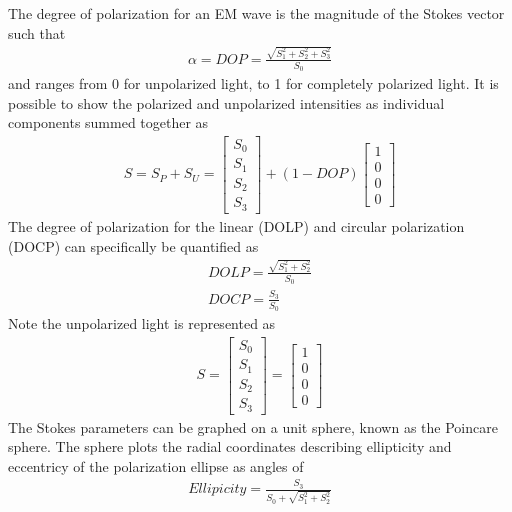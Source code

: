 %
The degree of polarization for an EM wave is the magnitude of the Stokes vector such that
%
\begin{align}
    \alpha =DOP=  \frac{\sqrt{S_1^2+S_2^2+S_3^2 }}{S_0}
\end{align}
%
and ranges from 0 for unpolarized light, to 1 for completely polarized light.  It is possible to show the polarized and unpolarized intensities as individual components
summed together as
%
\begin{align}
    S=S_P+S_U=
    \begin{bmatrix}
        S_0 \\
        S_1 \\
        S_2 \\
        S_3
    \end{bmatrix}
    +(1-DOP)
    \begin{bmatrix}
        1 \\
        0 \\
        0 \\
        0
    \end{bmatrix}
\end{align}
%
The degree of polarization for the linear (DOLP) and circular polarization (DOCP) can specifically be quantified as
%
\begin{align}
    DOLP=  \frac{\sqrt{S_1^2+S_2^2 }}{S_0} \\
    DOCP=  \frac{S_3}{S_0}
\end{align}
%
Note the unpolarized light is represented as
%
\begin{align}
    S=
    \begin{bmatrix}
        S_0 \\
        S_1 \\
        S_2 \\
        S_3
    \end{bmatrix}
    =
    \begin{bmatrix}
        1 \\
        0 \\
        0 \\
        0
    \end{bmatrix}
\end{align}
%
The Stokes parameters can be graphed on a unit sphere, known as the Poincare sphere.  The sphere plots the radial coordinates describing ellipticity and eccentricy of the polarization ellipse as angles of
%
\begin{align}
    Ellipicity = \frac{S_3}{S_0+\sqrt{S_1^2+S_2^2 }}
\end{align}
